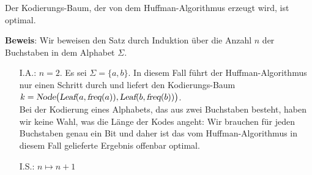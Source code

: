 \begin{Proposition}
  Der Kodierungs-Baum, der von dem Huffman-Algorithmus erzeugt wird, ist optimal.
\end{Proposition}

\noindent
\textbf{Beweis}:  Wir beweisen den Satz durch Induktion \"uber die Anzahl $n$ der Buchstaben in dem
Alphabet $\Sigma$.
\begin{enumerate}
\item[I.A.:] $n = 2$.  Es sei $\Sigma= \{a,b\}$.
  In diesem Fall f\"uhrt der Huffman-Algorithmus nur einen Schritt durch und liefert den Kodierungs-Baum 
  \\[0.2cm]
  \hspace*{1.3cm}
  $k=\textsl{Node}\bigl(\textsl{Leaf}(a, \textsl{freq}(a)), \textsl{Leaf}(b,\textsl{freq}(b))\bigr)$.
  \\[0.2cm]
  Bei der Kodierung eines Alphabets, das aus zwei Buchstaben besteht, haben wir keine Wahl, 
  was die L\"ange der Kodes angeht: Wir brauchen f\"ur jeden Buchstaben genau ein Bit und daher ist das vom
  Huffman-Algorithmus in diesem Fall gelieferte Ergebnis offenbar optimal.
\item[I.S.:] $n \mapsto n+1$


\end{enumerate}
